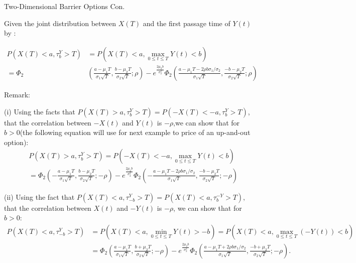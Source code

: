 \documentclass{beamer}
\begin{document}
\begin{frame}{Two-Dimensional Barrier Options Con.}

    {\footnotesize \footnotesize
    \par Given the joint distribution between \( X(T) \) and the first passage time of \( Y(t) \) by :
    \vspace{-1em}
    {\footnotesize \tiny
    \begin{align*}
    P(X(T) < a, \tau_b^Y > T) &= P\left(X(T) < a, \max_{0 \leq t \leq T} Y(t) < b\right) \\
    = \Phi_2 & \left( \frac{a - \mu_1 T}{\sigma_1 \sqrt{T}}, \frac{b - \mu_2 T}{\sigma_2 \sqrt{T}} ; \rho \right) - 
    e^{\frac{2 \mu_2 b}{\sigma_2^2} } \Phi_2 \left( \frac{a - \mu_1 T - 2 \rho b \sigma_1 / \sigma_2}{\sigma_1 \sqrt{T}}, \frac{-b - \mu_2 T}{\sigma_2 \sqrt{T}} ; \rho \right)
    \end{align*}
    
    \par Remark: 
    \par (i) Using the facts that $P(X(T) > a, \tau_b^Y > T) = P(-X(T) < -a, \tau_b^Y > T)$, 
    that the correlation between \(-X(t)\) and \(Y(t)\) is \(-\rho\),we can show that for \(b > 0\)(the following equation will use for next example 
    to price of an up-and-out option):
    \begin{align*}
    &P(X(T) > a, \tau_b^Y > T) = P\left(-X(T) < - a, \max_{0 \leq t \leq T} Y(t) < b\right) \\
    &= \Phi_2 \left( -\frac{a - \mu_1 T}{\sigma_1 \sqrt{T}}, \frac{b - \mu_2 T}{\sigma_2 \sqrt{T}}; -\rho \right)
    - e^{\frac{2 \mu_2 b}{\sigma_2^2} } \Phi_2 \left( -\frac{a - \mu_1 T - 
    2\rho b\sigma_1/\sigma_2}{\sigma_1 \sqrt{T}}, \frac{-b - \mu_2 T}{\sigma_2 \sqrt{T}}; -\rho \right)
    \end{align*}
    \par (ii) Using the fact that $ P(X(T) < a, \tau_{-b}^Y > T) = P(X(T) < a, \tau_b^{-Y} > T),$
     that the correlation between \(X(t)\) and \(-Y(t)\) is \(-\rho\), we can show that for \(b > 0\):
    \begin{align*}
    P(X(T) < a, \tau_{-b}^Y > T) &= P\left(X(T) < a, \min_{0 \leq t \leq T} Y(t) > -b\right) 
    = P\left(X(T) < a, \max_{0 \leq t \leq T} (-Y(t)) < b\right) \\
    &= \Phi_2 \left( \frac{a - \mu_1 T}{\sigma_1 \sqrt{T}}, \frac{b + \mu_2 T}{\sigma_2 \sqrt{T}}; -\rho \right) 
    - e^{\frac{2 \mu_2 b}{\sigma_2^2} }\Phi_2 \left( \frac{a - \mu_1 T + 2\rho b\sigma_1/\sigma_2}{\sigma_1 \sqrt{T}}, \frac{-b + \mu_2 T}{\sigma_2 \sqrt{T}}; -\rho \right).
    \end{align*}
    }
    }
    
\end{frame}
\end{document}

